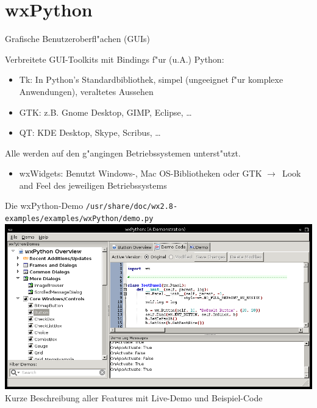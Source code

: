 \section{wxPython}


\begin{frame}{Grafische Benutzeroberfl"achen (GUIs)}

Verbreitete GUI-Toolkits mit Bindings f"ur (u.A.) Python:
\begin{itemize}
\item \alert{Tk}: In Python's Standardbibliothek, simpel (ungeeignet f"ur komplexe Anwendungen), veraltetes Aussehen
\item \alert{GTK}: z.B. Gnome Desktop, GIMP, Eclipse, \dots
\item \alert{QT}: KDE Desktop, Skype, Scribus, \dots
\end{itemize}
Alle werden auf den g"angingen Betriebssystemen unterst"utzt.
\vspace{3mm}
\begin{itemize}
\item \alert{wxWidgets}: Benutzt  Windows-, Mac OS-Bibliotheken oder GTK $\rightarrow$~Look and Feel des jeweiligen Betriebssystems
\end{itemize}
\end{frame}

\begin{frame}{Die wxPython-Demo}
\lstinline{/usr/share/doc/wx2.8-examples/examples/wxPython/demo.py}\\[2mm]
\includegraphics[width=\textwidth]{images/wxpython_demo.png}\\
Kurze Beschreibung aller Features mit Live-Demo und Beispiel-Code
\end{frame}

